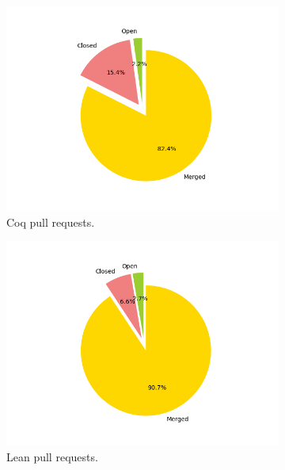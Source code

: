\documentclass[sigconf,nonacm]{acmart}
\begin{document}
\begin{figure}[H]
  \begin{subfigure}[b]{0.45\columnwidth}
    \includegraphics[width=\linewidth]{coq_prs_sate.png}
    \caption{Coq pull requests.}
    \label{coq prs}
  \end{subfigure}
  \hfill %
  \begin{subfigure}[b]{0.45\columnwidth}
    \includegraphics[width=\linewidth]{Lean_pull_requests_state.png}
    \caption{Lean pull requests.}
    \label{lean prs}
  \end{subfigure}
  \begin{subfigure}[b]{0.45\columnwidth}

\end{subfigure}
\end{figure}
\end{document}
